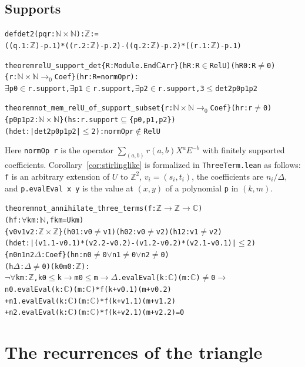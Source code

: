 \documentclass[11pt]{amsart}
\theoremstyle{definition}
\newcommand{\lean}[1]{\texttt{#1}}
\newcommand{\C}{\mathbb{C}}
\newcommand{\Z}{\mathbb{Z}}
\newcommand{\NN}{\mathbb{N}}
\begin{document}
\subsection*{Supports}
\begin{alltt}\small
def det2 (p q r : \(\NN\times\NN\)) : \(\Z\) :=
  ((q.1 : \(\Z\)) - p.1) * ((r.2 : \(\Z\)) - p.2) - ((q.2 : \(\Z\)) - p.2) * ((r.1 : \(\Z\)) - p.1)

theorem relU_support_det \{R : Module.End \(\C\) Arr\} (hR : R \(\in\) RelU) (hR0 : R \(\ne\) 0)
    \{r : \(\NN\times\NN\) \(\to_0\) Coef\} (hr : R = normOp r) :
    \(\exists\) p0 \(\in\) r.support, \(\exists\) p1 \(\in\) r.support, \(\exists\) p2 \(\in\) r.support, 3 \(\le\) det2 p0 p1 p2

theorem not_mem_relU_of_support_subset \{r : \(\NN\times\NN\) \(\to_0\) Coef\} (hr : r \(\ne\) 0)
    \{p0 p1 p2 : \(\NN\times\NN\)\} (hs : r.support \(\subseteq\) \{p0, p1, p2\})
    (hdet : |det2 p0 p1 p2| \(\le\) 2) : normOp r \(\notin\) RelU
\end{alltt}
Here \lean{normOp r} is the operator $\sum_{(a,b)}r(a,b)X^aE^{-b}$ with finitely supported coefficients.
Corollary~\ref{cor:stirlinglike} is formalized in \lean{ThreeTerm.lean} as follows: \lean{f} is an arbitrary extension of $U$ to $\Z^2$, $v_i=(s_i,t_i)$, the coefficients are $n_i/\Delta$, and \lean{p.evalEval x y} is the value at $(x,y)$ of a polynomial \lean{p} in $(k,m)$.
\begin{alltt}\small
theorem not_annihilate_three_terms (f : \(\Z\) \(\to\) \(\Z\) \(\to\) \(\C\))
    (hf : \(\forall\) k m : \(\NN\), f k m = U k m)
    \{v0 v1 v2 : \(\Z\times\Z\)\} (h01 : v0 \(\ne\) v1) (h02 : v0 \(\ne\) v2) (h12 : v1 \(\ne\) v2)
    (hdet : |(v1.1 - v0.1) * (v2.2 - v0.2) - (v1.2 - v0.2) * (v2.1 - v0.1)| \(\le\) 2)
    \{n0 n1 n2 \(\Delta\) : Coef\} (hn : n0 \(\ne\) 0 \(\lor\) n1 \(\ne\) 0 \(\lor\) n2 \(\ne\) 0)
    (h\(\Delta\) : \(\Delta\) \(\ne\) 0) (k0 m0 : \(\Z\)) :
    \(\lnot\) \(\forall\) k m : \(\Z\), k0 \(\le\) k \(\to\) m0 \(\le\) m \(\to\) \(\Delta\).evalEval (k : \(\C\)) (m : \(\C\)) \(\ne\) 0 \(\to\)
      n0.evalEval (k : \(\C\)) (m : \(\C\)) * f (k + v0.1) (m + v0.2)
        + n1.evalEval (k : \(\C\)) (m : \(\C\)) * f (k + v1.1) (m + v1.2)
        + n2.evalEval (k : \(\C\)) (m : \(\C\)) * f (k + v2.1) (m + v2.2) = 0
\end{alltt}

\section{The recurrences of the triangle}\label{app:relN}
\end{document}
